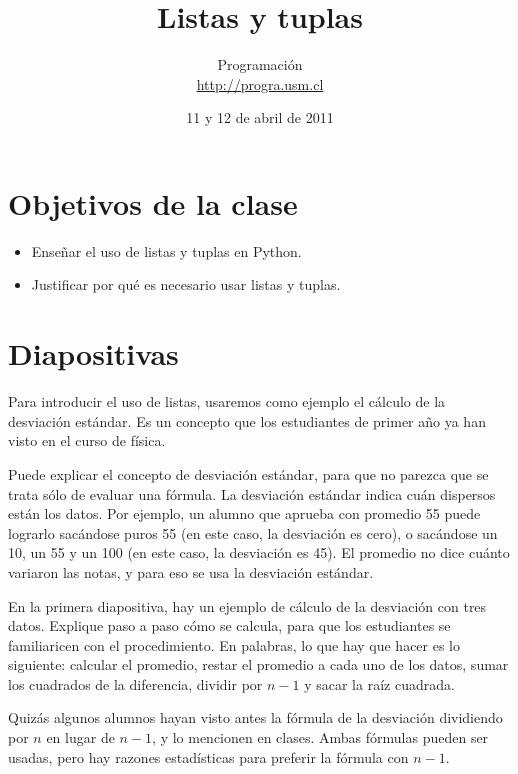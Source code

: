 \documentclass[10pt]{article}
\title{Listas y tuplas}
\author{Programación \\ \url{http://progra.usm.cl}}
\date{11 y 12 de abril de 2011}
\begin{document}
  \maketitle

  \section*{Objetivos de la clase}
  \begin{itemize}
    \item Enseñar el uso de listas y tuplas en Python.
    \item Justificar por qué es necesario
      usar listas y tuplas.
  \end{itemize}

  \section*{Diapositivas}


  Para introducir el uso de listas,
  usaremos como ejemplo el cálculo de la desviación estándar.
  Es un concepto que los estudiantes de primer año
  ya han visto en el curso de física.

  Puede explicar el concepto de desviación estándar,
  para que no parezca que se trata sólo de evaluar una fórmula.
  La desviación estándar indica cuán dispersos están los datos.
  Por ejemplo,
  un alumno que aprueba con promedio 55 puede lograrlo
  sacándose puros 55 (en este caso, la desviación es cero),
  o sacándose un 10, un 55 y un 100 (en este caso, la desviación es 45).
  El promedio no dice cuánto variaron las notas,
  y para eso se usa la desviación estándar.

  En la primera diapositiva,
  hay un ejemplo de cálculo de la desviación
  con tres datos.
  Explique paso a paso cómo se calcula,
  para que los estudiantes se familiaricen con el procedimiento.
  En palabras,
  lo que hay que hacer es lo siguiente:
  calcular el promedio,
  restar el promedio a cada uno de los datos,
  sumar los cuadrados de la diferencia,
  dividir por \(n - 1\) y sacar la raíz cuadrada.

  Quizás algunos alumnos hayan visto antes
  la fórmula de la desviación dividiendo por \(n\) en lugar de \(n - 1\),
  y lo mencionen en clases.
  Ambas fórmulas pueden ser usadas,
  pero hay razones estadísticas para preferir la fórmula con \(n - 1\).

\end{document}
